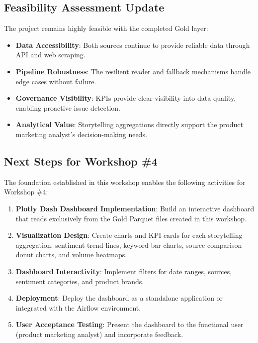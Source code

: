 \documentclass[12pt]{article}
\begin{document}
\subsection{Feasibility Assessment Update}

The project remains highly feasible with the completed Gold layer:

\begin{itemize}
    \item \textbf{Data Accessibility}: Both sources continue to provide reliable data through API and web scraping.
    \item \textbf{Pipeline Robustness}: The resilient reader and fallback mechanisms handle edge cases without failure.
    \item \textbf{Governance Visibility}: KPIs provide clear visibility into data quality, enabling proactive issue detection.
    \item \textbf{Analytical Value}: Storytelling aggregations directly support the product marketing analyst's decision-making needs.
\end{itemize}

\subsection{Next Steps for Workshop \#4}

The foundation established in this workshop enables the following activities for Workshop \#4:

\begin{enumerate}
    \item \textbf{Plotly Dash Dashboard Implementation}: Build an interactive dashboard that reads exclusively from the Gold Parquet files created in this workshop.
    
    \item \textbf{Visualization Design}: Create charts and KPI cards for each storytelling aggregation: sentiment trend lines, keyword bar charts, source comparison donut charts, and volume heatmaps.
    
    \item \textbf{Dashboard Interactivity}: Implement filters for date ranges, sources, sentiment categories, and product brands.
    
    \item \textbf{Deployment}: Deploy the dashboard as a standalone application or integrated with the Airflow environment.
    
    \item \textbf{User Acceptance Testing}: Present the dashboard to the functional user (product marketing analyst) and incorporate feedback.
\end{enumerate}
\end{document}
